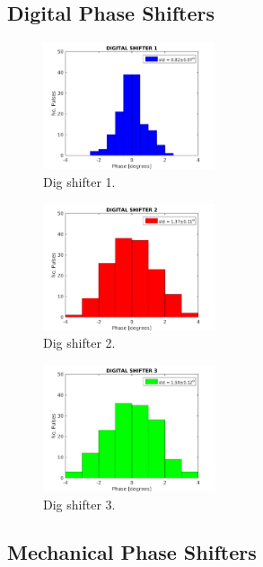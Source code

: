 \subsection{Digital Phase Shifters}
\label{ss:digShiftNoise}

\begin{figure}
  \centering
  \includegraphics[width=0.45\textwidth]{Figures/PhMon_HistDig1}
  \caption{Dig shifter 1.}
  \label{f:PhMon_HistDig1}
\end{figure}

\begin{figure}
  \centering
  \includegraphics[width=0.45\textwidth]{Figures/PhMon_HistDig2}
  \caption{Dig shifter 2.}
  \label{f:PhMon_HistDig2}
\end{figure}

\begin{figure}
  \centering
  \includegraphics[width=0.45\textwidth]{Figures/PhMon_HistDig3}
  \caption{Dig shifter 3.}
  \label{f:PhMon_HistDig3}
\end{figure}

\subsection{Mechanical Phase Shifters}
\label{ss:mechShiftNoise}

